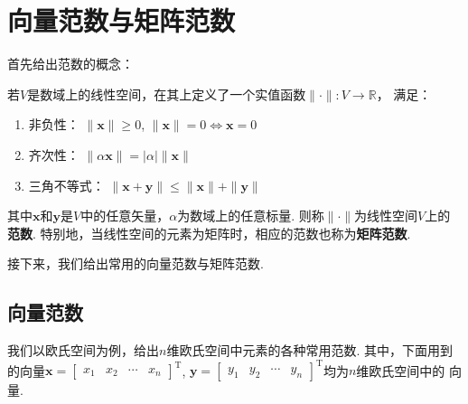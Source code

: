 \chapter{向量范数与矩阵范数}\label{apx.matrix-norm}
首先给出范数的概念：

\begin{definition}[范数]
    若$V$是数域上的线性空间，在其上定义了一个实值函数$\|\cdot\|:V \to \mathbb{R}$，
    满足：
    \begin{enumerate}
        \item 非负性： $\|\bm{x}\| \geq 0$, $\|\bm{x}\|=0 \Leftrightarrow \bm{x} =0$
        \item 齐次性： $\|\alpha \bm{x}\|=|\alpha|\|\bm{x}\|$
        \item 三角不等式： $\|\bm{x}+\bm{y}\| \leq \|\bm{x}\|+\|\bm{y}\|$
    \end{enumerate}
    其中\( \bm{x} \)和\( \bm{y} \)是$V$中的任意矢量，$\alpha$为数域上的任意标量. 则称$\|\cdot\|$为线性空间$V$上的\textbf{范数}. 特别地，当线性空间的元素为矩阵时，相应的范数也称为\textbf{矩阵范数}.
\end{definition}

接下来，我们给出常用的向量范数与矩阵范数.

\section{向量范数}
我们以欧氏空间为例，给出$n$维欧氏空间中元素的各种常用范数. 其中，下面用到的向量$\bm{x}=\begin{bmatrix} x_1 & x_2 & \cdots & x_n \end{bmatrix}^{\mathrm{T}}$, $\bm{y}=\begin{bmatrix} y_1 & y_2 & \cdots & y_n \end{bmatrix}^{\mathrm{T}}$均为$n$维欧氏空间中的
向量.

